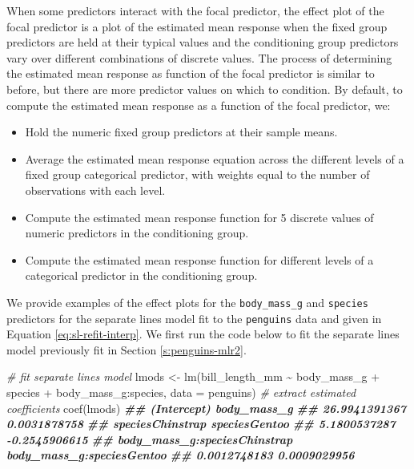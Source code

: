 \documentclass[
]{book}
\newenvironment{Shaded}{\begin{snugshade}}{\end{snugshade}}
\newcommand{\AttributeTok}[1]{\textcolor[rgb]{0.77,0.63,0.00}{#1}}
\newcommand{\CommentTok}[1]{\textcolor[rgb]{0.56,0.35,0.01}{\textit{#1}}}
\newcommand{\DocumentationTok}[1]{\textcolor[rgb]{0.56,0.35,0.01}{\textbf{\textit{#1}}}}
\newcommand{\FunctionTok}[1]{\textcolor[rgb]{0.00,0.00,0.00}{#1}}
\newcommand{\NormalTok}[1]{#1}
\newcommand{\OtherTok}[1]{\textcolor[rgb]{0.56,0.35,0.01}{#1}}
\newcommand{\SpecialCharTok}[1]{\textcolor[rgb]{0.00,0.00,0.00}{#1}}
\providecommand{\tightlist}{%
  \setlength{\itemsep}{0pt}\setlength{\parskip}{0pt}}
\theoremstyle{definition}
\theoremstyle{definition}
\theoremstyle{definition}
\theoremstyle{definition}
\theoremstyle{remark}
\begin{document}
When some predictors interact with the focal predictor, the effect plot
of the focal predictor is a plot of the estimated mean response when the
fixed group predictors are held at their typical values and the
conditioning group predictors vary over different combinations of
discrete values. The process of determining the estimated mean response
as function of the focal predictor is similar to before, but there are
more predictor values on which to condition. By default, to compute the
estimated mean response as a function of the focal predictor, we:

\begin{itemize}
\tightlist
\item
  Hold the numeric fixed group predictors at their sample means.
\item
  Average the estimated mean response equation across the different
  levels of a fixed group categorical predictor, with weights equal to
  the number of observations with each level.
\item
  Compute the estimated mean response function for 5 discrete
  values of numeric predictors in the conditioning group.
\item
  Compute the estimated mean response function for different levels
  of a categorical predictor in the conditioning group.
\end{itemize}

We provide examples of the effect plots for the \texttt{body\_mass\_g} and
\texttt{species} predictors for the separate lines model fit to the \texttt{penguins}
data and given in Equation \eqref{eq:sl-refit-interp}. We first run the
code below to fit the separate lines model previously fit in Section
\ref{s:penguins-mlr2}.

\begin{Shaded}
\begin{Highlighting}[]
\CommentTok{\# fit separate lines model}
\NormalTok{lmods }\OtherTok{\textless{}{-}} \FunctionTok{lm}\NormalTok{(bill\_length\_mm }\SpecialCharTok{\textasciitilde{}}\NormalTok{ body\_mass\_g }\SpecialCharTok{+}\NormalTok{ species }\SpecialCharTok{+}\NormalTok{ body\_mass\_g}\SpecialCharTok{:}\NormalTok{species,}
            \AttributeTok{data =}\NormalTok{ penguins)}
\CommentTok{\# extract estimated coefficients}
\FunctionTok{coef}\NormalTok{(lmods)}
\DocumentationTok{\#\#                  (Intercept)                  body\_mass\_g }
\DocumentationTok{\#\#                26.9941391367                 0.0031878758 }
\DocumentationTok{\#\#             speciesChinstrap                speciesGentoo }
\DocumentationTok{\#\#                 5.1800537287                {-}0.2545906615 }
\DocumentationTok{\#\# body\_mass\_g:speciesChinstrap    body\_mass\_g:speciesGentoo }
\DocumentationTok{\#\#                 0.0012748183                 0.0009029956}
\end{Highlighting}
\end{Shaded}
\end{document}
